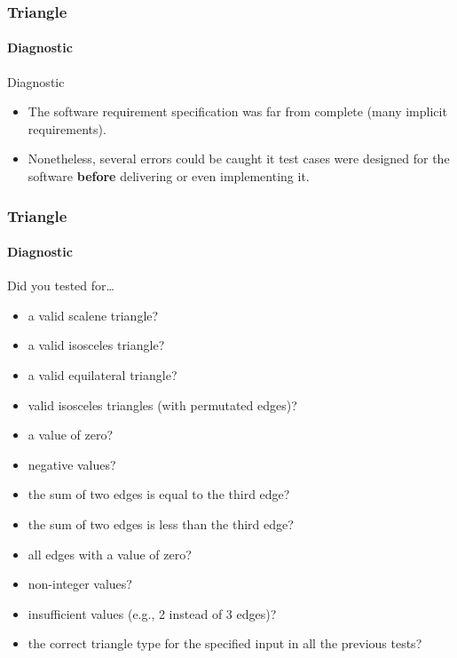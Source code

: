 \begin{frame}
\frametitle{Triangle}
\framesubtitle{Diagnostic}

\begin{block:fact}{Diagnostic}
\begin{itemize}
	\item The software requirement specification was far from complete (many
	implicit requirements).

	\item Nonetheless, several errors could be caught it test cases were
	designed for the software \textbf{before} delivering or even implementing
	it.
\end{itemize}
\end{block:fact}
\end{frame}



\begin{frame}[hasprev=true,hasnext=false]
\frametitle{Triangle}
\framesubtitle{Diagnostic}

\begin{block:fact}{Did you tested for\dots}
\begin{itemize}
	\item a valid scalene triangle?
	\item a valid isosceles triangle?
	\item a valid equilateral triangle?
	\item valid isosceles triangles (with permutated edges)?
	\item a value of zero?
	\item negative values?
	\item the sum of two edges is equal to the third edge?
	\item the sum of two edges is less than the third edge?
	\item all edges with a value of zero?
    \item non-integer values?
    \item insufficient values (e.g., 2 instead of 3 edges)?
    \item the correct triangle type for the specified input in all the previous
    tests?
\end{itemize}
\end{block:fact}
\end{frame}